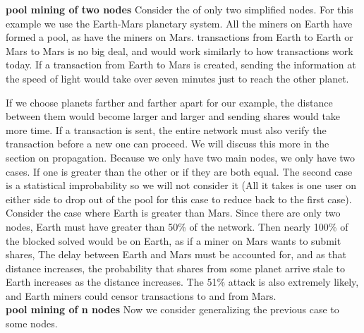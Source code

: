 \documentclass[conference]{IEEEtran}
\begin{document}
\textbf{pool mining of two nodes} Consider the of only two simplified nodes. For this example we use the Earth-Mars planetary system. All the miners on Earth have formed a pool, as have the miners on Mars. transactions from Earth to Earth or Mars to Mars is no big deal, and would work similarly to how transactions work today. If a transaction from Earth to Mars is created, sending the information at the speed of light would take over seven minutes just to reach the other planet. 

If we choose planets farther and farther apart for our example, the distance between them would become larger and larger and sending shares would take more time. If a transaction is sent, the entire network must also verify the transaction before a new one can proceed. We will discuss this more in the section on propagation.
Because we only have two main nodes, we only have two cases. If one is greater than the other or if they are both equal. The second case is a statistical improbability so we will not consider it (All it takes is one user on either side to drop out of the pool for this case to reduce back to the first case). Consider the case where Earth is greater than Mars. Since there are only two nodes, Earth must have greater than 50\% of the network. Then nearly 100\% of the blocked solved would be on Earth, as if a miner on Mars wants to submit shares, The delay between Earth and Mars must be accounted for, and as that distance increases, the probability that shares from some planet arrive stale to Earth increases as the distance increases. The 51\% attack is also extremely likely, and Earth miners could censor transactions to and from Mars.\\
\textbf{pool mining of n nodes} Now we consider generalizing the previous case to some  nodes. 
\end{document}
